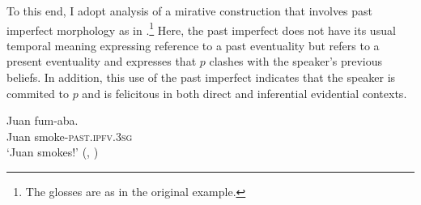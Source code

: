 \documentclass[output=paper,
colorlinks,
citecolor=brown,
newtxmath
]{langscibook}
\begin{document}
%
%
%

To this end, I adopt  analysis of a  mirative construction that involves past imperfect morphology as in .\footnote{The glosses are as in the original example.} Here, the past imperfect does not have its usual temporal meaning expressing reference to a past eventuality but refers to a present eventuality and expresses that $p$ clashes with the speaker's previous beliefs. In addition, this use of the past imperfect indicates that the speaker is commited to $p$ and is felicitous in both direct and inferential evidential contexts.


\ea\label{ex:fumaba}
\gll Juan fum-aba. \hfill \\
Juan smoke-\textsc{past.ipfv.3sg}\\
\glt `Juan smokes!' \hfill (, \citealt[34]{Bustamante2013})\\
\z

%
%
\end{document}
